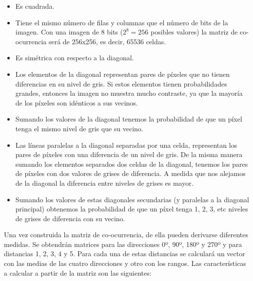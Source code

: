 \begin{itemize}

\item Es cuadrada.

\item Tiene el mismo número de filas y columnas que el número de bits de la imagen. Con una imagen de 8 bits ($2^{8} = 256$ posibles valores) la matriz de co-ocurrencia será de 256x256, es decir, 65536 celdas.

\item Es simétrica con respecto a la diagonal.

\item Los elementos de la diagonal representan pares de píxeles que no tienen diferencias en su nivel de gris. Si estos elementos tienen probabilidades grandes, entonces la imagen no muestra mucho contraste, ya que la mayoría de los píxeles son idénticos a sus vecinos.

\item Sumando los valores de la diagonal tenemos la probabilidad de que un píxel tenga el mismo nivel de gris que su vecino.

\item Las líneas paralelas a la diagonal separadas por una celda, representan los pares de píxeles con una diferencia de un nivel de gris. De la misma manera sumando los elementos separados dos celdas de la diagonal, tenemos los pares de píxeles con dos valores de grises de diferencia. A medida que nos alejamos de la diagonal la diferencia entre niveles de grises es mayor.

\item Sumando los valores de estas diagonales secundarias (y paralelas a la diagonal principal) obtenemos la probabilidad de que un píxel tenga 1, 2, 3, etc niveles de grises de diferencia con su vecino.

\end{itemize}

Una vez construida la matriz de co-ocurrencia, de ella pueden derivarse diferentes medidas. Se obtendrán matrices para las direcciones 0º, 90º, 180º y 270º y para distancias 1, 2, 3, 4 y 5. Para cada una de estas distancias se calculará un vector con las medias de las cuatro direcciones y otro con los rangos. Las características a calcular a partir de la matriz son las siguientes:

